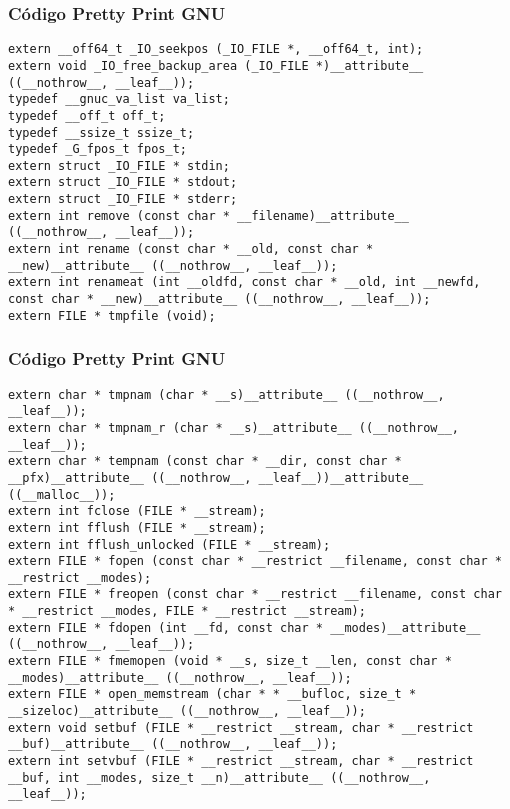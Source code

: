 \documentclass{beamer}
\begin{document}
\begin{frame}[fragile]
\frametitle{C\'odigo Pretty Print GNU}
\begin{verbatim}
extern __off64_t _IO_seekpos (_IO_FILE *, __off64_t, int);
extern void _IO_free_backup_area (_IO_FILE *)__attribute__ ((__nothrow__, __leaf__));
typedef __gnuc_va_list va_list;
typedef __off_t off_t;
typedef __ssize_t ssize_t;
typedef _G_fpos_t fpos_t;
extern struct _IO_FILE * stdin;
extern struct _IO_FILE * stdout;
extern struct _IO_FILE * stderr;
extern int remove (const char * __filename)__attribute__ ((__nothrow__, __leaf__));
extern int rename (const char * __old, const char * __new)__attribute__ ((__nothrow__, __leaf__));
extern int renameat (int __oldfd, const char * __old, int __newfd, const char * __new)__attribute__ ((__nothrow__, __leaf__));
extern FILE * tmpfile (void);
\end{verbatim}
\end{frame}
\begin{frame}[fragile]
\frametitle{C\'odigo Pretty Print GNU}
\begin{verbatim}
extern char * tmpnam (char * __s)__attribute__ ((__nothrow__, __leaf__));
extern char * tmpnam_r (char * __s)__attribute__ ((__nothrow__, __leaf__));
extern char * tempnam (const char * __dir, const char * __pfx)__attribute__ ((__nothrow__, __leaf__))__attribute__ ((__malloc__));
extern int fclose (FILE * __stream);
extern int fflush (FILE * __stream);
extern int fflush_unlocked (FILE * __stream);
extern FILE * fopen (const char * __restrict __filename, const char * __restrict __modes);
extern FILE * freopen (const char * __restrict __filename, const char * __restrict __modes, FILE * __restrict __stream);
extern FILE * fdopen (int __fd, const char * __modes)__attribute__ ((__nothrow__, __leaf__));
extern FILE * fmemopen (void * __s, size_t __len, const char * __modes)__attribute__ ((__nothrow__, __leaf__));
extern FILE * open_memstream (char * * __bufloc, size_t * __sizeloc)__attribute__ ((__nothrow__, __leaf__));
extern void setbuf (FILE * __restrict __stream, char * __restrict __buf)__attribute__ ((__nothrow__, __leaf__));
extern int setvbuf (FILE * __restrict __stream, char * __restrict __buf, int __modes, size_t __n)__attribute__ ((__nothrow__, __leaf__));
\end{verbatim}
\end{frame}
\end{document}
